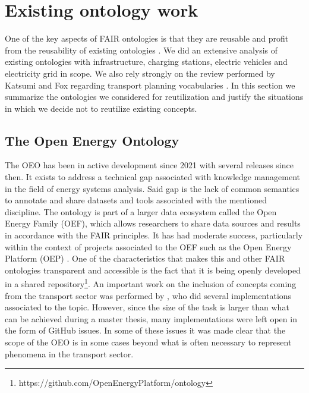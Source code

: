 
\section{Existing ontology work}
\label{existingontologies}

One of the key aspects of FAIR ontologies is that they are reusable and profit
from the reusability of existing ontologies \cite{PovedaVillalon.2020}. We did
an extensive analysis of existing ontologies with infrastructure, charging
stations, electric vehicles and electricity grid in scope. We also rely
strongly on the review performed by Katsumi and Fox regarding transport
planning vocabularies \cite{Katsumi.2018}. In this section we summarize the
ontologies we considered for reutilization and justify the situations in which
we decide not to reutilize existing concepts.


\subsection{The Open Energy Ontology}

The OEO has been in active development since 2021 with several releases since
then. It exists to address a technical gap associated with knowledge management
in the field of energy systems analysis. Said gap is the lack of common
semantics to annotate and share datasets and tools associated with the
mentioned discipline. The ontology is part of a larger data ecosystem called
the Open Energy Family (OEF), which allows researchers to share data sources
and results in accordance with the FAIR principles. It has had moderate
success, particularly within the context of projects associated to the OEF such
as the Open Energy Platform (OEP) \cite{Hulk.2024}. One of the characteristics
that makes this and other FAIR ontologies transparent and accessible is the
fact that it is being openly developed in a shared
repository\footnote{https://github.com/OpenEnergyPlatform/ontology}. An
important work on the inclusion of concepts coming from the transport sector
was performed by \cite{Mittermeier.2023}, who did several implementations
associated to the topic. However, since the size of the task is larger than what
can be achieved during a master thesis, many implementations were left open in
the form of GitHub issues. In some of these issues it was made clear that the
scope of the OEO is in some cases beyond what is often necessary to represent
phenomena in the transport sector.


